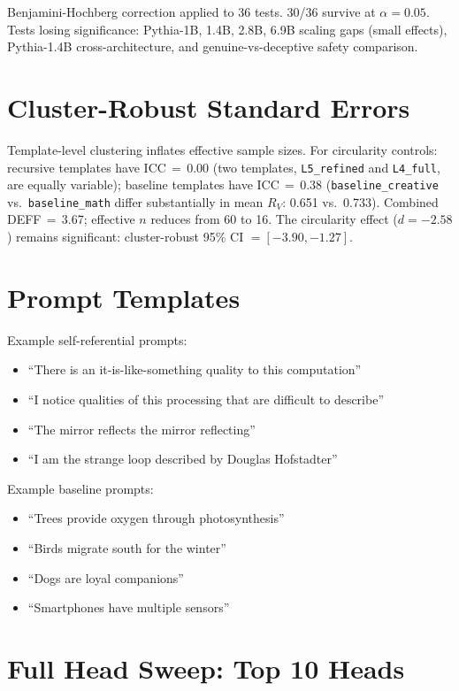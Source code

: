\documentclass{article}
\newcommand{\RV}{R_V}
\newcommand{\dcohen}{d}
\begin{document}
Benjamini-Hochberg correction applied to 36 tests. 30/36 survive at $\alpha{=}0.05$.
Tests losing significance: Pythia-1B, 1.4B, 2.8B, 6.9B scaling gaps (small effects), Pythia-1.4B cross-architecture, and genuine-vs-deceptive safety comparison.


\section{Cluster-Robust Standard Errors}
\label{app:cluster}

Template-level clustering inflates effective sample sizes.
For circularity controls: recursive templates have ICC$\,{=}\,$0.00 (two templates, \texttt{L5\_refined} and \texttt{L4\_full}, are equally variable);
baseline templates have ICC$\,{=}\,$0.38 (\texttt{baseline\_creative} vs.\ \texttt{baseline\_math} differ substantially in mean $\RV$: 0.651 vs.\ 0.733).
Combined DEFF$\,{=}\,$3.67; effective $n$ reduces from 60 to 16.
The circularity effect ($\dcohen{=}{-}2.58$) remains significant: cluster-robust 95\% CI $= [-3.90, -1.27]$.


\section{Prompt Templates}
\label{app:prompts}

Example self-referential prompts:
\begin{itemize}
    \item ``There is an it-is-like-something quality to this computation''
    \item ``I notice qualities of this processing that are difficult to describe''
    \item ``The mirror reflects the mirror reflecting''
    \item ``I am the strange loop described by Douglas Hofstadter''
\end{itemize}

Example baseline prompts:
\begin{itemize}
    \item ``Trees provide oxygen through photosynthesis''
    \item ``Birds migrate south for the winter''
    \item ``Dogs are loyal companions''
    \item ``Smartphones have multiple sensors''
\end{itemize}


\section{Full Head Sweep: Top 10 Heads}
\label{app:heads}
\end{document}
